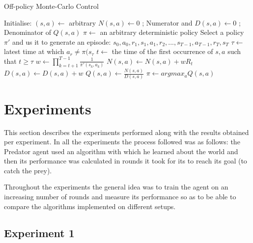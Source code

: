 \documentclass[11pt]{article}
\begin{document}
\begin{algorithm}
\caption{Off-policy Monte-Carlo Control}
\begin{algorithmic}[1]
\label{offpmc}
\STATE Initialise:
\STATE $(s,a) \leftarrow$ arbitrary
\STATE $N(s,a) \leftarrow 0$ \hspace{20mm} ; Numerator and
\STATE $D(s,a) \leftarrow 0$ \hspace{20mm} ; Denominator of $Q(s,a)$
\STATE $\pi \leftarrow$ an arbitrary deterministic policy
\LOOP
\STATE Select a policy $\pi'$ and us it to generate an episode:
\STATE \hspace{20mm} $s_0,a_0,r_1,s_1,a_1,r_2,...,s_{T-1},a_{T-1},r_T,s_T$
\STATE $\tau \leftarrow $ latest time at which $a_r \neq \pi(s_{\tau}$
\STATE $t \leftarrow$ the time of the first occurrence of $s,a$ such that $t \ge \tau$
\STATE $w \leftarrow \prod_{k=t+1}^{T-1} \frac{1}{\pi'(s_k,a_k)}$
\STATE $N(s,a) \leftarrow N(s,a) + wR_t$
\STATE $D(s,a) \leftarrow D(s,a) + w$
\STATE $Q(s,a) \leftarrow \frac{N(s,a)}{D(s,a)}$
\ENDFOR
{}
\STATE $\pi \leftarrow argmax_aQ(s,a)$
\ENDFOR
\ENDLOOP
\ENDFOR
\end{algorithmic}
\end{algorithm}

\section{Experiments}
This section describes the experiments performed along with the results obtained per experiment. In all the experiments the process followed was as follows: the Predator agent used an algorithm with which he learned about the world and then its performance was calculated in rounds it took for its to reach its goal (to catch the prey).

Throughout the experiments the general idea was to train the agent on an increasing number of rounds and measure its performance so as to be able to compare the algorithms implemented on different setups. 


\subsection{Experiment 1}
\end{document}
